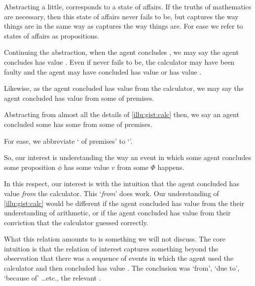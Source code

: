 \begin{note}
  Abstracting a little, \propM{\gistCalcEq{}} corresponds to a state of affairs.
  If the truths of mathematics are necessary, then this state of affairs never fails to be, but \propM{\gistCalcEq{}} captures the way things are in the same way as  captures the way things are.
  For ease we refer to states of affairs as propositions.

  Continuing the abstraction, when the agent concludes \propM{\gistCalcEq{}}, we may say the agent concludes \propM{\gistCalcEq{}} has value .
  Even if \propM{\gistCalcEq{}} never fails to be, the calculator may have been faulty and the agent may have concluded \propM{\gistCalcEqBad{}} has value  or \propM{\gistCalcEq{}} has value .

  Likewise, as the agent concluded \propM{\gistCalcEq{}} has value  from the calculator, we may say the agent concluded \propM{\gistCalcEq{}} has value  from some \pool{} of premises.%
\end{note}

\begin{note}
  Abstracting from almost all the details of \autoref{illu:gist:calc} then, we say an agent concluded some \prop{} has some \val{} from some \pool{} of premises.

  For ease, we abbreviate `\pool{} of premises' to `\pool{}'.

  So, our interest is understanding the way an event in which some agent concludes some proposition \(\phi\) has some value \(v\) from some \pool{} \(\Phi\) happens.

  In this respect, our interest is with the intuition that the agent concluded \propM{\gistCalcEq{}} has value  \emph{from} the calculator.
  This `\emph{from}' does work.
  Our understanding of \autoref{illu:gist:calc} would be different if the agent concluded \propM{\gistCalcEq{}} has value  from the their understanding of arithmetic, or if the agent concluded \propM{\gistCalcEq{}} has value  from their conviction that the calculator guessed correctly.

  What this relation amounts to is something we will not discuss.
  The core intuition is that the relation of interest captures something beyond the observation that there was a sequence of events in which the agent used the calculator and then concluded \propM{\gistCalcEq{}} has value .
  The conclusion was `from', `due to', `because of' \dots etc., the relevant \pool{}.
\end{note}

